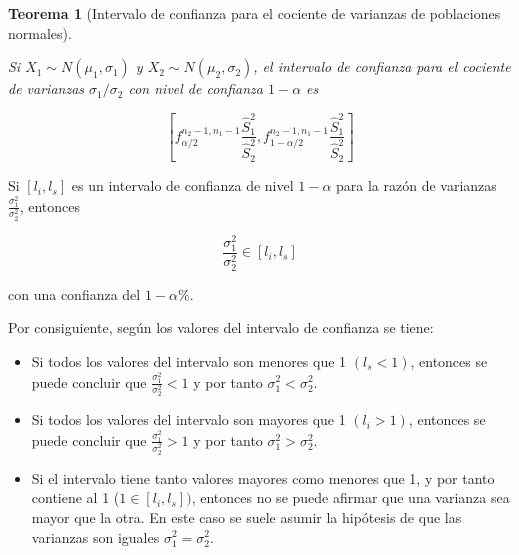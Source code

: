 \documentclass[
  spanish,
  a4paper,
]{scrreport}
\providecommand{\tightlist}{%
  \setlength{\itemsep}{0pt}\setlength{\parskip}{0pt}}
\theoremstyle{plain}
\newtheorem{theorem}{Teorema}[chapter]
\theoremstyle{definition}
\theoremstyle{definition}
\theoremstyle{remark}
\begin{document}
\begin{theorem}[Intervalo de confianza para el cociente de varianzas de
poblaciones
normales]\protect\hypertarget{thm-intervalo-confianza-cociente-varianzas-normales-varianzas}{}\label{thm-intervalo-confianza-cociente-varianzas-normales-varianzas}

Si \(X_1\sim N(\mu_1,\sigma_1)\) y \(X_2\sim N(\mu_2,\sigma_2)\), el
\emph{intervalo de confianza para el cociente de varianzas}
\(\sigma_1/\sigma_2\) con nivel de confianza \(1-\alpha\) es

\[
\left[f^{n_2-1,n_1-1}_{\alpha/2}\frac{\hat{S}_1^2}{\hat{S}_2^2},f^{n_2-1,n_1-1}_{1-\alpha/2}\frac{\hat{S}_1^2}{\hat{S}_2^2}\right]
\]

\end{theorem}

Si \([l_i,l_s]\) es un intervalo de confianza de nivel \(1-\alpha\) para
la razón de varianzas \(\frac{\sigma_1^2}{\sigma_2^2}\), entonces

\[
\frac{\sigma_1^2}{\sigma_2^2} \in [l_i,l_s]
\]

con una confianza del \(1-\alpha\%\).

Por consiguiente, según los valores del intervalo de confianza se tiene:

\begin{itemize}
\tightlist
\item
  Si todos los valores del intervalo son menores que 1 \((l_s<1)\),
  entonces se puede concluir que \(\frac{\sigma_1^2}{\sigma_2^2}<1\) y
  por tanto \(\sigma_1^2<\sigma_2^2\).
\item
  Si todos los valores del intervalo son mayores que 1 \((l_i>1)\),
  entonces se puede concluir que \(\frac{\sigma_1^2}{\sigma_2^2}>1\) y
  por tanto \(\sigma_1^2>\sigma_2^2\).
\item
  Si el intervalo tiene tanto valores mayores como menores que 1, y por
  tanto contiene al 1 (\(1\in [l_i,l_s])\), entonces no se puede afirmar
  que una varianza sea mayor que la otra. En este caso se suele asumir
  la hipótesis de que las varianzas son iguales
  \(\sigma_1^2=\sigma_2^2\).
\end{itemize}
\end{document}
